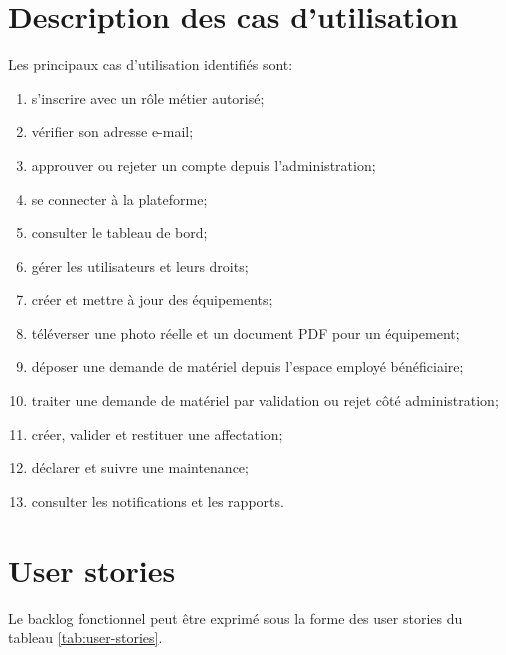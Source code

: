 \section{Description des cas d'utilisation}
Les principaux cas d'utilisation identifiés sont:
\begin{enumerate}
  \item s'inscrire avec un rôle métier autorisé;
  \item vérifier son adresse e-mail;
  \item approuver ou rejeter un compte depuis l'administration;
  \item se connecter à la plateforme;
  \item consulter le tableau de bord;
  \item gérer les utilisateurs et leurs droits;
  \item créer et mettre à jour des équipements;
  \item téléverser une photo réelle et un document PDF pour un équipement;
  \item déposer une demande de matériel depuis l'espace employé bénéficiaire;
  \item traiter une demande de matériel par validation ou rejet côté administration;
  \item créer, valider et restituer une affectation;
  \item déclarer et suivre une maintenance;
  \item consulter les notifications et les rapports.
\end{enumerate}

\section{User stories}
Le backlog fonctionnel peut être exprimé sous la forme des user stories du tableau \ref{tab:user-stories}.


